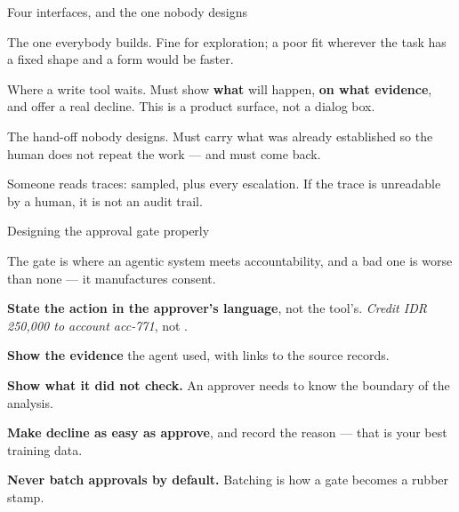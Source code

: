 \documentclass[aspectratio=169,11pt,t]{beamer}
\begin{document}
\begin{frame}[shrink=25]{Four interfaces, and the one nobody designs}
\begin{minipage}[t]{0.494\textwidth}
\begin{icard}
The one everybody builds. Fine for exploration; a poor fit wherever the task has a fixed shape and a form would be faster.
\end{icard}
\end{minipage}%
\hfill
\begin{minipage}[t]{0.494\textwidth}
\begin{icardaccent}
Where a write tool waits. Must show \textbf{what} will happen, \textbf{on what evidence}, and offer a real decline. This is a product surface, not a dialog box.
\end{icardaccent}
\end{minipage}%


\vskip 4pt

\begin{minipage}[t]{0.494\textwidth}
\begin{icardaccent}
The hand-off nobody designs. Must carry what was already established so the human does not repeat the work --- and must come back.
\end{icardaccent}
\end{minipage}%
\hfill
\begin{minipage}[t]{0.494\textwidth}
\begin{icardaccent}
Someone reads traces: sampled, plus every escalation. If the trace is unreadable by a human, it is not an audit trail.
\end{icardaccent}
\end{minipage}%
\end{frame}

\begin{frame}[shrink=25]{Designing the approval gate properly}
{\fontsize{9.4}{12.6}\selectfont\color{fg2}The gate is where an agentic system meets accountability, and a bad one is worse than none --- it manufactures consent.\par}\vskip 4pt
\begin{ibullets}
\item \textbf{State the action in the approver's language}, not the tool's. \textit{Credit IDR 250,000 to account acc-771}, not .
\item \textbf{Show the evidence} the agent used, with links to the source records.
\item \textbf{Show what it did not check.} An approver needs to know the boundary of the analysis.
\item \textbf{Make decline as easy as approve}, and record the reason --- that is your best training data.
\item \textbf{Never batch approvals by default.} Batching is how a gate becomes a rubber stamp.
\end{ibullets}
\end{frame}
\end{document}
